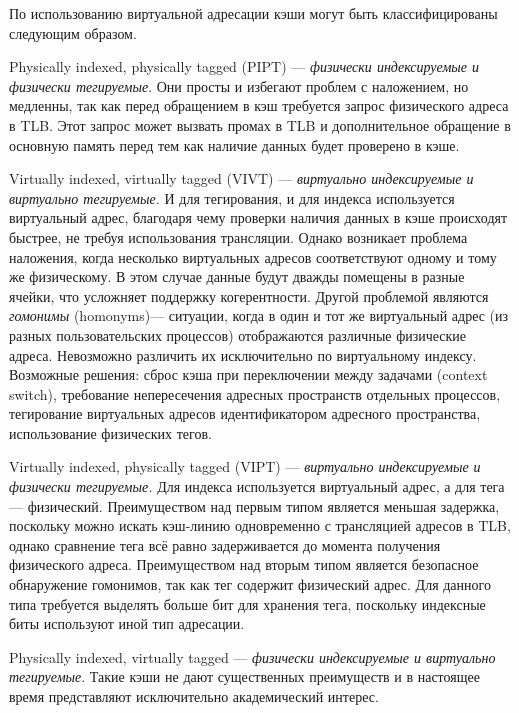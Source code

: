 По использованию виртуальной адресации кэши могут быть классифицированы следующим образом. 
\begin{enumerate*}
\item Physically indexed, physically tagged (PIPT) --- \textit{физически индексируемые и физически тегируемые}. Они просты и избегают проблем с наложением, но медленны, так как перед обращением в кэш требуется запрос физического адреса в TLB. Этот запрос может вызвать промах в TLB и дополнительное обращение в основную память перед тем как наличие данных будет проверено в кэше.

\item Virtually indexed, virtually tagged (VIVT) --- \textit{виртуально индексируемые и виртуально тегируемые.} И для тегирования, и для индекса используется виртуальный адрес, благодаря чему проверки наличия данных в кэше происходят быстрее, не требуя использования трансляции. Однако возникает проблема наложения, когда несколько виртуальных адресов соответствуют одному и тому же физическому. В этом случае данные будут дважды помещены в разные ячейки, что усложняет поддержку когерентности. Другой проблемой являются \textit{гомонимы} (\abbr homonyms)---  ситуации, когда в один и тот же виртуальный адрес (из разных пользовательских процессов) отображаются различные физические адреса. Невозможно различить их исключительно по виртуальному индексу. Возможные решения: сброс кэша при переключении между задачами (context switch), требование непересечения адресных пространств отдельных процессов, тегирование виртуальных адресов идентификатором адресного пространства, использование физических тегов.

\item Virtually indexed, physically tagged (VIPT) --- \textit{виртуально индексируемые и физически тегируемые.} Для индекса используется виртуальный адрес, а для тега --- физический. Преимуществом над первым типом является меньшая задержка, поскольку можно искать кэш-линию одновременно с трансляцией адресов в TLB, однако сравнение тега всё равно задерживается до момента получения физического адреса. Преимуществом над вторым типом является безопасное обнаружение гомонимов, так как тег содержит физический адрес. Для данного типа требуется выделять больше бит для хранения тега, поскольку индексные биты используют иной тип адресации.

\item Physically indexed, virtually tagged --- \textit{физически индексируемые и виртуально тегируемые}. Такие кэши не дают существенных преимуществ и в настоящее время представляют исключительно академический интерес.
\end{enumerate*}

